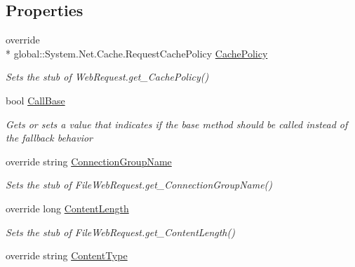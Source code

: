 \subsection*{Properties}
\begin{DoxyCompactItemize}
\item 
override \\*
global\-::\-System.\-Net.\-Cache.\-Request\-Cache\-Policy \hyperlink{class_system_1_1_net_1_1_fakes_1_1_stub_file_web_request_a94c7beed3e83de5af05d25766ffac0f8}{Cache\-Policy}
\begin{DoxyCompactList}\small\item\em Sets the stub of Web\-Request.\-get\-\_\-\-Cache\-Policy()\end{DoxyCompactList}\item 
bool \hyperlink{class_system_1_1_net_1_1_fakes_1_1_stub_file_web_request_a5c4c12c0c722bac1fb1f84f057edbea3}{Call\-Base}
\begin{DoxyCompactList}\small\item\em Gets or sets a value that indicates if the base method should be called instead of the fallback behavior\end{DoxyCompactList}\item 
override string \hyperlink{class_system_1_1_net_1_1_fakes_1_1_stub_file_web_request_a3f3190901f9122790c150ce4a4fb73a3}{Connection\-Group\-Name}
\begin{DoxyCompactList}\small\item\em Sets the stub of File\-Web\-Request.\-get\-\_\-\-Connection\-Group\-Name()\end{DoxyCompactList}\item 
override long \hyperlink{class_system_1_1_net_1_1_fakes_1_1_stub_file_web_request_acf7c0c7744e54ac4d7f076539fca7d68}{Content\-Length}
\begin{DoxyCompactList}\small\item\em Sets the stub of File\-Web\-Request.\-get\-\_\-\-Content\-Length()\end{DoxyCompactList}\item 
override string \hyperlink{class_system_1_1_net_1_1_fakes_1_1_stub_file_web_request_ae00c2f28434a0eb22d1b8ac38921207f}{Content\-Type}

\end{DoxyCompactItemize}
